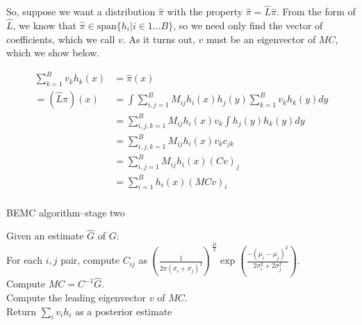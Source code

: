 \documentclass{article}
\newcommand\EMK[1]{\textcolor{purple}{EMK: #1}}
\begin{document}
So, suppose we want a distribution $\hat{\pi}$ with the property $\hat{\pi}=\hat{L}\hat{\pi}$. From the form of $\hat{L}$, we know that $\hat{\pi}\in \text{span}\{h_i|i \in 1...B\}$, so we need only find the vector of coefficients, which we call $v$. As it turns out, $v$ must be an eigenvector of $MC$, which we show below. 

\begin{align*}
 \sum_{k=1}^Bv_kh_k(x)&=\hat{\pi}(x) \\
= (\hat{L}\hat{\pi})(x) &= \int \sum_{i,j=1}^B M_{ij} h_i(x)h_j(y) \sum_{k=1}^Bv_kh_k(y)dy\\
&=  \sum_{i,j,k=1}^B M_{ij} h_i(x)v_k\int h_j(y)h_k(y)dy\\
&=  \sum_{i,j,k=1}^B M_{ij} h_i(x)v_kc_{jk}\\
&=  \sum_{i,j=1}^B M_{ij} h_i(x)(Cv)_j\\
&=  \sum_{i=1}^B h_i(x)(MCv)_i\\
\end{align*}


\begin{algorithm}[h]
\caption{BEMC algorithm--stage two}
Given an estimate $\hat{G}$ of $G$:\\
For each $i,j$ pair, compute $C_{ij}$ as $(\frac{1}{2\pi (\sigma_i+\sigma_j)^2})^{\frac{D}{2}}\exp(\frac{-(\mu_i-\mu_j)^2}{2\sigma_i^2+2\sigma_j^2})$.\\
Compute ${M}C=C^{-1}\hat{G}$.\\
Compute the leading eigenvector $v$ of $MC$. \\
Return $\sum_i v_i h_i$ as a posterior estimate\\
\end{algorithm}

\end{document}
